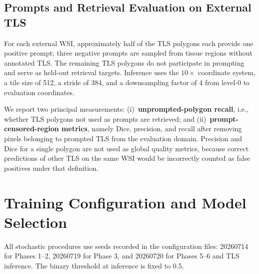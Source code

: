 \documentclass[11pt,letterpaper]{article}
\begin{document}
\subsection{Prompts and Retrieval Evaluation on External TLS}
For each external WSI, approximately half of the TLS polygons each provide one positive prompt; three negative prompts are sampled from tissue regions without annotated TLS. The remaining TLS polygons do not participate in prompting and serve as held-out retrieval targets. Inference uses the $10\times$ coordinate system, a tile size of 512, a stride of 384, and a downsampling factor of 4 from level-0 to evaluation coordinates.

We report two principal measurements: (i)~\textbf{unprompted-polygon recall}, i.e., whether TLS polygons not used as prompts are retrieved; and (ii)~\textbf{prompt-censored-region metrics}, namely Dice, precision, and recall after removing pixels belonging to prompted TLS from the evaluation domain. Precision and Dice for a single polygon are not used as global quality metrics, because correct predictions of other TLS on the same WSI would be incorrectly counted as false positives under that definition.

\section{Training Configuration and Model Selection}
All stochastic procedures use seeds recorded in the configuration files: 20260714 for Phases 1--2, 20260719 for Phase 3, and 20260720 for Phases 5--6 and TLS inference. The binary threshold at inference is fixed to 0.5.
\end{document}

